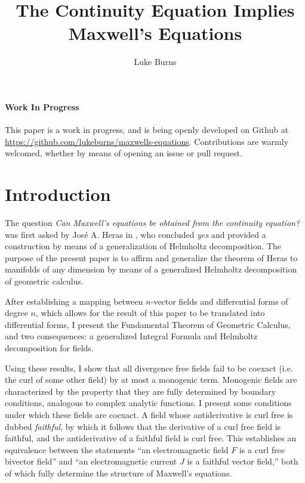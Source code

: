 \documentclass{article}
\title{The Continuity Equation Implies Maxwell's Equations}
\author{Luke Burns}
\begin{document}
\maketitle
{}

\paragraph{Work In Progress} This paper is a work in progress, and is being openly developed on Github at \url{https://github.com/lukeburns/maxwells-equations}. Contributions are warmly welcomed, whether by means of opening an issue or pull request.

\section{Introduction}

The question \emph{Can Maxwell’s equations be obtained from
the continuity equation?} was first asked by Jos\'e A. Heras in \cite{heras}, who concluded \emph{yes} and provided a construction by means of a generalization of Helmholtz decomposition. The purpose of the present paper is to affirm and generalize the theorem of Heras to manifolds of any dimension by means of a generalized Helmholtz decomposition of geometric calculus.

After establishing a mapping between $n$-vector fields and differential forms of degree $n$, which allows for the result of this paper to be translated into differential forms, I present the Fundamental Theorem of Geometric Calculus, and two consequences: a generalized Integral Formula and Helmholtz decomposition for fields.

Using these results, I show that all divergence free fields fail to be coexact (i.e. the curl of some other field) by at most a monogenic term. Monogenic fields are characterized by the property that they are fully determined by boundary conditions, analogous to complex analytic functions. I present some conditions under which these fields are coexact. A field whose antiderivative is curl free is dubbed \emph{faithful}, by which it follows that the derivative of a curl free field is faithful, and the antiderivative of a faithful field is curl free. This establishes an equivalence between the statements ``an electromagnetic field $F$ is a curl free bivector field'' and ``an electromagnetic current $J$ is a faithful vector field,'' both of which fully determine the structure of Maxwell's equations. 
\end{document}
